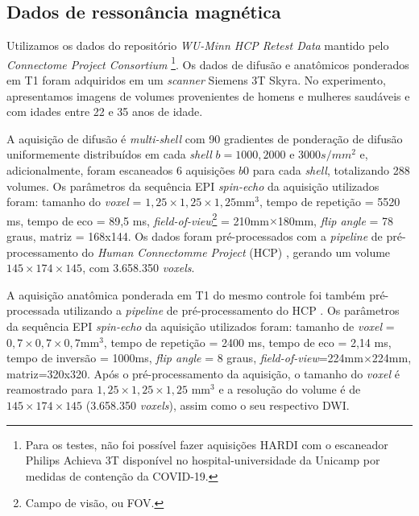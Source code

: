 \subsection{Dados de ressonância magnética}
\label{sssec::dados_de_ressonancia_magnetica}


Utilizamos os dados do repositório \textit{WU-Minn HCP Retest Data} mantido pelo \textit{Connectome Project Consortium} \cite{essen2012}\footnote{Para os testes, não foi possível fazer aquisições HARDI com o escaneador Philips Achieva 3T disponível no hospital-universidade da Unicamp por medidas de contenção da COVID-19.}.
Os dados de difusão e anatômicos ponderados em T1 foram adquiridos em um \textit{scanner} Siemens 3T Skyra. No experimento, apresentamos imagens de volumes provenientes de homens e mulheres saudáveis e com idades entre 22 e 35 anos de idade.

A aquisição de difusão é \textit{multi-shell} com 90 gradientes de ponderação de difusão uniformemente distribuídos em cada \textit{shell} $b = 1000, 2000$ e $3000 s/mm^2$ e, adicionalmente, foram escaneados 6 aquisições $b0$ para cada \textit{shell}, totalizando 288 volumes. Os parâmetros da sequência EPI \textit{spin-echo} da aquisição utilizados foram: tamanho do \textit{voxel} = $1,25\times 1,25 \times 1,25$mm$^3$, tempo de repetição = 5520 ms, tempo de eco = 89,5 ms, \textit{field-of-view}\footnote{Campo de visão, ou FOV.} = 210mm$\times$180mm, \textit{flip angle} = 78 graus, matriz = 168x144. Os dados foram pré-processados com a \textit{pipeline} de pré-processamento do \textit{Human Connectomme Project} (HCP) \cite{glasser2013}, gerando um volume $145\times 174\times  145$, com 3.658.350 \textit{voxels}.

A aquisição anatômica ponderada em T1 do mesmo controle foi também pré-processada utilizando a \textit{pipeline} de pré-processamento do HCP \cite{glasser2013}. Os parâmetros da sequência EPI \textit{spin-echo} da aquisição utilizados foram: tamanho de \textit{voxel} = $0,7\times 0,7 \times 0,7$mm$^3$, tempo de repetição = 2400 ms, tempo de eco = 2,14 ms, tempo de inversão = 1000ms, \textit{flip angle} = 8 graus, \textit{field-of-view}=224mm$\times$224mm, matriz=320x320. Após o pré-processamento da aquisição, o tamanho do \textit{voxel} é reamostrado para $1,25\times 1,25 \times 1,25$ mm$^3$ e a resolução do volume é de $145\times 174\times 145$ (3.658.350 \textit{voxels}), assim como o seu respectivo DWI.


